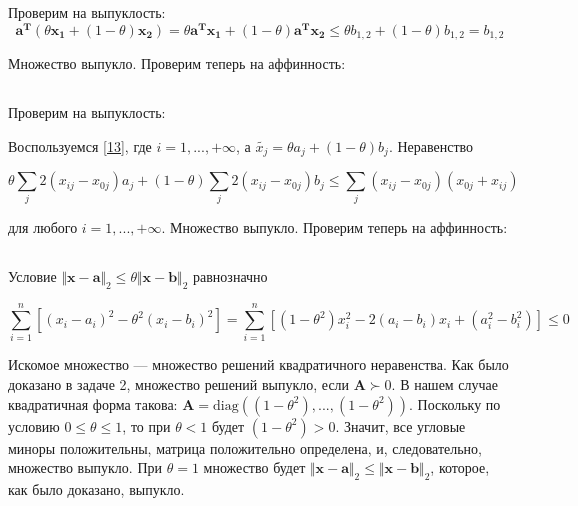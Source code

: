 	Проверим на выпуклость:
	\begin{equation}
	\mathbf{a^T} (\theta \mathbf{x_1} + (1 - \theta) \mathbf{x_2}) = \theta
	\mathbf{a^T} \mathbf{x_1} + (1 - \theta) \mathbf{a^T} \mathbf{x_2} \leqslant 
	\theta b_{1,2} + (1 - \theta) b_{1,2} = b_{1,2}
	\end{equation}
	
	Множество выпукло. Проверим теперь на аффинность:
	
	\subsection{}
	
	Проверим на выпуклость:
	
	Воспользуемся \eqref{13}, где $i=1,...,+\infty$, а $\tilde{x_j} = \theta a_j + (1-\theta) b_j$. Неравенство
	
	\begin{equation}
	\theta\sum_j 2(x_{ij}-x_{0j}) a_j + (1-\theta) \sum_j 2(x_{ij}-x_{0j}) b_j \leqslant \sum_j (x_{ij}-x_{0j}) (x_{0j}+x_{ij}) 
	\end{equation}
	
	для любого $i=1,...,+\infty$. Множество выпукло. Проверим теперь на аффинность:
	
	\subsection{}
	
	Условие $\Vert \mathbf{x} - \mathbf{a} \Vert_2 \leqslant \theta \Vert \mathbf{x} - \mathbf{b} \Vert_2$ равнозначно
	
	\begin{equation}
	\sum\limits_{i=1}^{n}\left[ (x_i - a_i)^2 - \theta^2 (x_i-b_i)^2 \right] = \sum\limits_{i=1}^{n}\left[(1-\theta^2)x_i^2 - 2(a_i-b_i)x_i + (a_i^2-b_i^2) \right] \leqslant 0
	\end{equation}
	
	Искомое множество --- множество решений квадратичного неравенства. Как было доказано в задаче 2, множество решений выпукло, если $\mathbf{A} \succ 0$. В нашем случае квадратичная форма такова: $\mathbf{A} = \text{diag}((1-\theta^2), ..., (1-\theta^2))$. Поскольку по условию $0 \leqslant \theta \leqslant 1$, то при $\theta < 1$ будет $(1-\theta^2) > 0$. Значит, все угловые миноры положительны, матрица положительно определена, и, следовательно, множество выпукло. При $\theta = 1$ множество будет $\Vert \mathbf{x} - \mathbf{a} \Vert_2 \leqslant  \Vert \mathbf{x} - \mathbf{b} \Vert_2$, которое, как было доказано, выпукло.
	
